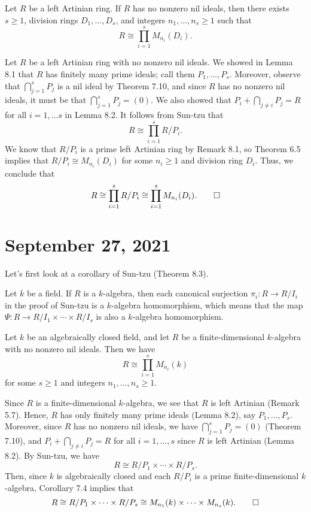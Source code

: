 \begin{thm}
Let $R$ be a left Artinian ring. If $R$ has no nonzero nil ideals, then there exists $s \geq 1$, 
division rings $D_1, \dots, D_s$, and integers $n_1, \dots, n_s \geq 1$ such that 
\[ R \cong \prod_{i=1}^s M_{n_i}(D_i). \]
\end{thm}
\begin{pf}
Let $R$ be a left Artinian ring with no nonzero nil ideals. We showed in Lemma 8.1 that $R$ 
has finitely many prime ideals; call them $P_1, \dots, P_s$. Moreover, observe that $\bigcap_{j=1}^s P_j$ is a nil ideal by Theorem 7.10, and since $R$ has no nonzero nil ideals, it must be that 
$\bigcap_{j=1}^s P_j = (0)$. We also showed that $P_i + \bigcap_{j\neq i} P_j = R$ for all 
$i = 1, \dots s$ in Lemma 8.2. It follows from Sun-tzu that 
\[ R \cong \prod_{i=1}^s R/P_i. \] 
We know that $R/P_i$ is a prime left Artinian ring by Remark 8.1, so Theorem 6.5 implies that 
$R/P_i \cong M_{n_i}(D_i)$ for some $n_i \geq 1$ and division ring $D_i$. Thus, we conclude that 
\[ R \cong \prod_{i=1}^s R/P_i \cong \prod_{i=1}^s M_{n_i}(D_i). \qedhere \]
\end{pf}

\section{September 27, 2021}

Let's first look at a corollary of Sun-tzu (Theorem 8.3).

\begin{remark}
Let $k$ be a field. If $R$ is a $k$-algebra, then each canonical surjection $\pi_i : R \to R/I_i$ 
in the proof of Sun-tzu is a $k$-algebra homomorphism, which means that the map
$\Psi : R \to R/I_1 \times \cdots \times R/I_s$ is also a $k$-algebra homomorphism. 
\end{remark}

\begin{cor}
Let $k$ be an algebraically closed field, and let $R$ be a finite-dimensional $k$-algebra with no nonzero
nil ideals. Then we have 
\[ R \cong \prod_{i=1}^s M_{n_i}(k) \]
for some $s \geq 1$ and integers $n_1, \dots, n_s \geq 1$. 
\end{cor}
\begin{pf}
Since $R$ is a finite-dimensional $k$-algebra, we see that $R$ is left Artinian (Remark 5.7).
Hence, $R$ has only finitely many prime ideals (Lemma 8.2), say $P_1, \dots, P_s$. Moreover, 
since $R$ has no nonzero nil ideals, we have $\bigcap_{j=1}^s P_j = (0)$ (Theorem 7.10), and 
$P_i + \bigcap_{j\neq i} P_j = R$ for all $i = 1, \dots, s$ since $R$ is left Artinian (Lemma 8.2). 
By Sun-tzu, we have 
\[ R \cong R/P_1 \times \cdots \times R/P_s. \]
Then, since $k$ is algebraically closed and each $R/P_i$ is a prime finite-dimensional $k$-algebra, 
Corollary 7.4 implies that 
\[ R \cong R/P_1 \times \cdots \times R/P_s \cong M_{n_1}(k) \times \cdots \times M_{n_s}(k). 
\qedhere \]
\end{pf}

